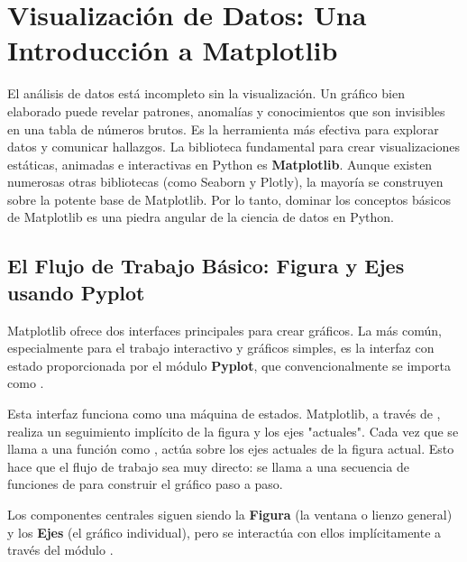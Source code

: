 \section{Visualización de Datos: Una Introducción a Matplotlib}
\label{sec:matplotlib_intro}
El análisis de datos está incompleto sin la visualización. Un gráfico bien elaborado puede revelar patrones, anomalías y conocimientos que son invisibles en una tabla de números brutos. Es la herramienta más efectiva para explorar datos y comunicar hallazgos. La biblioteca fundamental para crear visualizaciones estáticas, animadas e interactivas en Python es \textbf{Matplotlib}. Aunque existen numerosas otras bibliotecas (como Seaborn y Plotly), la mayoría se construyen sobre la potente base de Matplotlib. Por lo tanto, dominar los conceptos básicos de Matplotlib es una piedra angular de la ciencia de datos en Python.

\subsection{El Flujo de Trabajo Básico: Figura y Ejes usando Pyplot}
\label{subsec:matplotlib_workflow}
Matplotlib ofrece dos interfaces principales para crear gráficos. La más común, especialmente para el trabajo interactivo y gráficos simples, es la interfaz con estado proporcionada por el módulo \textbf{Pyplot}, que convencionalmente se importa como .

Esta interfaz funciona como una máquina de estados. Matplotlib, a través de , realiza un seguimiento implícito de la figura y los ejes "actuales". Cada vez que se llama a una función como , actúa sobre los ejes actuales de la figura actual. Esto hace que el flujo de trabajo sea muy directo: se llama a una secuencia de funciones de  para construir el gráfico paso a paso.

Los componentes centrales siguen siendo la \textbf{Figura} (la ventana o lienzo general) y los \textbf{Ejes} (el gráfico individual), pero se interactúa con ellos implícitamente a través del módulo .

